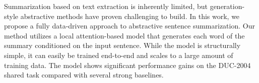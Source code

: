 Summarization based on text extraction is inherently limited, but generation-style abstractive methods have proven challenging to build. In this work, we propose a fully data-driven approach to abstractive sentence summarization. Our method utilizes a local attention-based model that generates each word of the summary conditioned on the input sentence. While the model is structurally simple, it can easily be trained end-to-end and scales to a large amount of training data. The model shows significant performance gains on the DUC-2004 shared task compared with several strong baselines.
